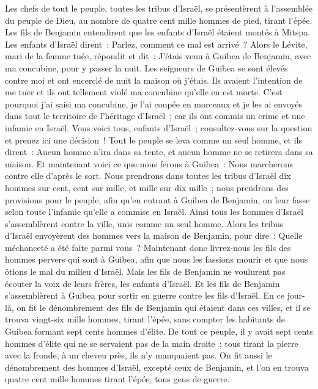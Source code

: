 \begin{multicols}{2}
Les chefs de tout le peuple, toutes les tribus d'Israël, se présentèrent à l'assemblée du peuple de Dieu, au nombre de quatre cent mille hommes de pied, tirant l'épée.
Les fils de Benjamin entendirent que les enfants d'Israël étaient montés à Mitspa. Les enfants d'Israël dirent~: Parlez, comment ce mal est arrivé~?
Alors le Lévite, mari de la femme tuée, répondit et dit~: J'étais venu à Guibea de Benjamin, avec ma concubine, pour y passer la nuit.
Les seigneurs de Guibea se sont élevés contre moi et ont encerclé de nuit la maison où j'étais. Ils avaient l'intention de me tuer et ils ont tellement violé ma concubine qu'elle en est morte.
C'est pourquoi j'ai saisi ma concubine, je l'ai coupée en morceaux et je les ai envoyés dans tout le territoire de l'héritage d'Israël~; car ils ont commis un crime et une infamie en Israël.
Vous voici tous, enfants d'Israël~; consultez-vous sur la question et prenez ici une décision~!
Tout le peuple se leva comme un seul homme, et ils dirent~: Aucun homme n'ira dans sa tente, et aucun homme ne se retirera dans sa maison.
Et maintenant voici ce que nous ferons à Guibea~: Nous marcherons contre elle d'après le sort.
Nous prendrons dans toutes les tribus d'Israël dix hommes sur cent, cent sur mille, et mille sur dix mille~; nous prendrons des provisions pour le peuple, afin qu'en entrant à Guibea de Benjamin, on leur fasse selon toute l'infamie qu'elle a commise en Israël.
Ainsi tous les hommes d'Israël s'assemblèrent contre la ville, unis comme un seul homme.
Alors les tribus d'Israël envoyèrent des hommes vers la maison de Benjamin, pour dire~: Quelle méchanceté a été faite parmi vous~?
Maintenant donc livrez-nous les fils des hommes pervers qui sont à Guibea, afin que nous les fassions mourir et que nous ôtions le mal du milieu d'Israël. Mais les fils de Benjamin ne voulurent pas écouter la voix de leurs frères, les enfants d'Israël.
Et les fils de Benjamin s'assemblèrent à Guibea pour sortir en guerre contre les fils d'Israël.
En ce jour-là, on fit le dénombrement des fils de Benjamin qui étaient dans ces villes, et il se trouva vingt-six mille hommes, tirant l'épée, sans compter les habitants de Guibea formant sept cents hommes d'élite.
De tout ce peuple, il y avait sept cents hommes d'élite qui ne se servaient pas de la main droite~; tous tirant la pierre avec la fronde, à un cheveu près, ils n'y manquaient pas.
On fit aussi le dénombrement des hommes d'Israël, excepté ceux de Benjamin, et l'on en trouva quatre cent mille hommes tirant l'épée, tous gens de guerre.

\end{multicols}
